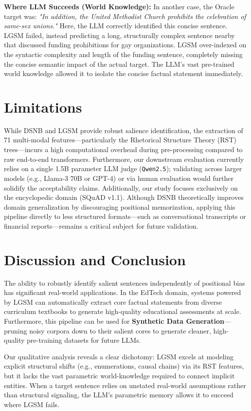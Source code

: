 \documentclass[11pt,a4paper,twocolumn]{article}
\begin{document}
\textbf{Where LLM Succeeds (World Knowledge):}
In another case, the Oracle target was: \textit{"In addition, the United Methodist Church prohibits the celebration of same-sex unions."}
Here, the LLM correctly identified this concise sentence. LGSM failed, instead predicting a long, structurally complex sentence nearby that discussed funding prohibitions for gay organizations. LGSM over-indexed on the syntactic complexity and length of the funding sentence, completely missing the concise semantic impact of the actual target. The LLM's vast pre-trained world knowledge allowed it to isolate the concise factual statement immediately.

\section{Limitations}
While DSNB and LGSM provide robust salience identification, the extraction of 71 multi-modal features---particularly the Rhetorical Structure Theory (RST) trees---incurs a high computational overhead during pre-processing compared to raw end-to-end transformers. Furthermore, our downstream evaluation currently relies on a single 1.5B parameter LLM judge (\texttt{Qwen2.5}); validating across larger models (e.g., Llama-3 70B or GPT-4) or via human evaluation would further solidify the acceptability claims. Additionally, our study focuses exclusively on the encyclopedic domain (SQuAD v1.1). Although DSNB theoretically improves domain generalization by discouraging positional memorization, applying this pipeline directly to less structured formats---such as conversational transcripts or financial reports---remains a critical subject for future validation.

\section{Discussion and Conclusion}
The ability to robustly identify salient sentences independently of positional bias has significant real-world applications. In the EdTech domain, systems powered by LGSM can automatically extract core factual statements from diverse curriculum textbooks to generate high-quality educational assessments at scale. Furthermore, this pipeline can be used for \textbf{Synthetic Data Generation}---pruning noisy corpora down to their salient cores to generate cleaner, high-quality pre-training datasets for future LLMs.

Our qualitative analysis reveals a clear dichotomy: LGSM excels at modeling explicit structural shifts (e.g., enumerations, causal chains) via its RST features, but it lacks the vast parametric world-knowledge required to connect implicit entities. When a target sentence relies on unstated real-world assumptions rather than structural signaling, the LLM's parametric memory allows it to succeed where LGSM fails. 
\end{document}

